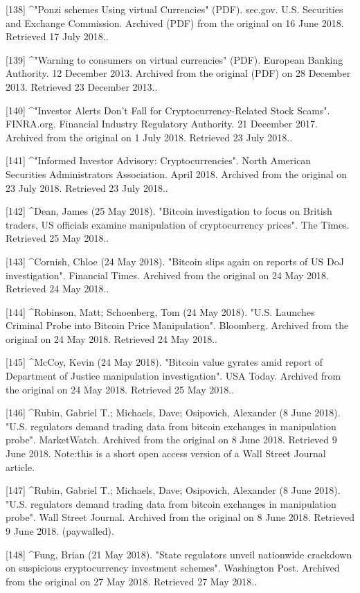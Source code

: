 [138]
^"Ponzi schemes Using virtual Currencies" (PDF). sec.gov. U.S. Securities and Exchange Commission. Archived (PDF) from the original on 16 June 2018. Retrieved 17 July 2018..

[139]
^"Warning to consumers on virtual currencies" (PDF). European Banking Authority. 12 December 2013. Archived from the original (PDF) on 28 December 2013. Retrieved 23 December 2013..

[140]
^"Investor Alerts Don't Fall for Cryptocurrency-Related Stock Scams". FINRA.org. Financial Industry Regulatory Authority. 21 December 2017. Archived from the original on 1 July 2018. Retrieved 23 July 2018..

[141]
^"Informed Investor Advisory: Cryptocurrencies". North American Securities Administrators Association. April 2018. Archived from the original on 23 July 2018. Retrieved 23 July 2018..

[142]
^Dean, James (25 May 2018). "Bitcoin investigation to focus on British traders, US officials examine manipulation of cryptocurrency prices". The Times. Retrieved 25 May 2018..

[143]
^Cornish, Chloe (24 May 2018). "Bitcoin slips again on reports of US DoJ investigation". Financial Times. Archived from the original on 24 May 2018. Retrieved 24 May 2018..

[144]
^Robinson, Matt; Schoenberg, Tom (24 May 2018). "U.S. Launches Criminal Probe into Bitcoin Price Manipulation". Bloomberg. Archived from the original on 24 May 2018. Retrieved 24 May 2018..

[145]
^McCoy, Kevin (24 May 2018). "Bitcoin value gyrates amid report of Department of Justice manipulation investigation". USA Today. Archived from the original on 24 May 2018. Retrieved 25 May 2018..

[146]
^Rubin, Gabriel T.; Michaels, Dave; Osipovich, Alexander (8 June 2018). "U.S. regulators demand trading data from bitcoin exchanges in manipulation probe". MarketWatch. Archived from the original on 8 June 2018. Retrieved 9 June 2018. Note:this is a short open access version of a Wall Street Journal article.

[147]
^Rubin, Gabriel T.; Michaels, Dave; Osipovich, Alexander (8 June 2018). "U.S. regulators demand trading data from bitcoin exchanges in manipulation probe". Wall Street Journal. Archived from the original on 8 June 2018. Retrieved 9 June 2018. (paywalled).

[148]
^Fung, Brian (21 May 2018). "State regulators unveil nationwide crackdown on suspicious cryptocurrency investment schemes". Washington Post. Archived from the original on 27 May 2018. Retrieved 27 May 2018..

